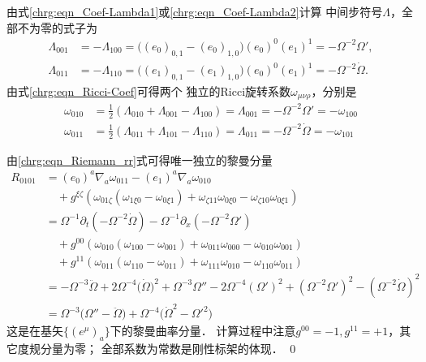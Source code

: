 \noindent {}
由式\eqref{chrg:eqn_Coef-Lambda1}或\eqref{chrg:eqn_Coef-Lambda2}计算
中间步符号$\Lambda$，全部不为零的式子为
\begin{align}
\Lambda_{001 } &= -\Lambda_{100}
= \bigl( (e_0)_{0,1}-(e_0)_{1,0} \bigr) (e_0)^{0} (e_1)^{1}
=  -\Omega^{-2} \Omega' , \\
\Lambda_{011 } &= -\Lambda_{110}
= \bigl( (e_1)_{0,1}-(e_1)_{1,0} \bigr) (e_0)^{0} (e_1)^{1}
=  -\Omega^{-2} \dot{\Omega} .
\end{align}
由式\eqref{chrg:eqn_Ricci-Coef}可得两个
独立的Ricci旋转系数$\omega_{\mu\nu\rho}$，分别是
\begin{align}
\omega_{010} &= \frac{1}{2}\left(\Lambda_{010} + \Lambda_{001} - \Lambda_{100} \right)
= \Lambda_{001} = -\Omega^{-2} \Omega' = -\omega_{100} \\
\omega_{011} &= \frac{1}{2}\left(\Lambda_{011} + \Lambda_{101} - \Lambda_{110} \right)
= \Lambda_{011} = -\Omega^{-2} \dot{\Omega}  = -\omega_{101}
\end{align}

\noindent {}
由\eqref{chrg:eqn_Riemann_rr}式可得唯一独立的黎曼分量
\begin{align*}
R_{0101} &= (e_0)^a\nabla_a \omega_{011} - (e_1)^a\nabla_a \omega_{010}  \\
&{\quad} + g^{\xi\zeta} \left(
 \omega_{01\zeta} ( \omega_{1\xi 0} - \omega_{0\xi 1} )
+ \omega _{\zeta 11} \omega _{0\xi 0} -\omega _{\zeta 10} \omega _{0\xi 1} \right)   \\
&= \Omega^{-1}\partial_t \left(-\Omega^{-2} \dot{\Omega} \right)
  -\Omega^{-1}\partial_x \left(-\Omega^{-2} \Omega' \right)  \\
&{\quad} + g^{00} ( \omega_{010} (\omega_{100} - \omega_{001} )
+ \omega _{011} \omega _{000} -\omega _{010} \omega _{001} )   \\
&{\quad} + g^{11} ( \omega_{011} ( \omega_{110} - \omega_{011} )
+ \omega _{111} \omega _{010} -\omega _{110} \omega _{011} )   \\
&= -\Omega^{-3} \ddot{\Omega} +2 \Omega^{-4}  \bigl(\dot{\Omega}\bigr)^2
+\Omega^{-3} \Omega'' -2 \Omega^{-4}  (\Omega')^2
 + \left( \Omega^{-2} \Omega' \right)^2
- \left( \Omega^{-2} \dot{\Omega} \right)^2     \\
&= \Omega^{-3} \bigl(\Omega'' -\ddot{\Omega} \bigr)
   +\Omega^{-4} \bigl(\dot{\Omega}^2 - \Omega'^2 \bigr)
\end{align*}
这是在基矢$\{(e^\mu)_{a}\}$下的黎曼曲率分量．
计算过程中注意$g^{00}=-1,g^{11}=+1$，其它度规分量为零；
全部系数为常数是刚性标架的体现．
\qed


